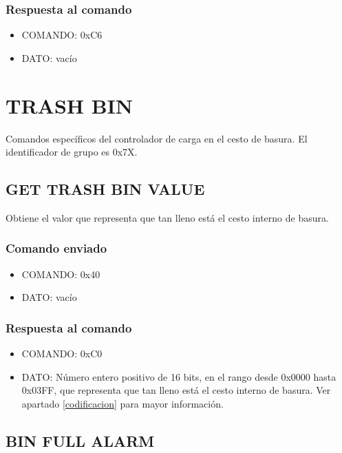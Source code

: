 \documentclass[a4paper,10pt]{article}
\begin{document}
\subsubsection*{Respuesta al comando}

\begin{itemize}
	\item{COMANDO:} 0xC6
	\item{DATO:} vac\'io
\end{itemize}

\section{TRASH BIN}
\label{grupo_trash_bin}

Comandos espec\'ificos del controlador de carga en el cesto de basura.
El identificador de grupo es 0x7X.

\subsection{GET TRASH BIN VALUE}
\label{get_trash_bin_value}

Obtiene el valor que representa que tan lleno est\'a el cesto interno de basura.

\subsubsection*{Comando enviado}

\begin{itemize}
	\item{COMANDO:} 0x40
	\item{DATO:} vac\'io
\end{itemize}

\subsubsection*{Respuesta al comando}

\begin{itemize}
	\item{COMANDO:} 0xC0
	\item{DATO:} N\'umero entero positivo de 16 bits, en el rango desde 0x0000 hasta 0x03FF,
		que representa que tan lleno est\'a el cesto interno de basura.
		Ver apartado \ref{codificacion} para mayor informaci\'on.
\end{itemize}

\subsection{BIN FULL ALARM}
\label{bin_full_alarm}
\end{document}
